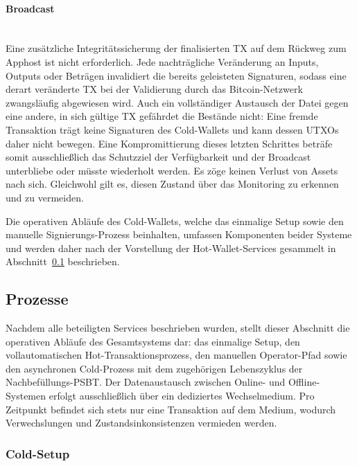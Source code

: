 \paragraph{Broadcast} \mbox{}\\
Eine zusätzliche Integritätssicherung der finalisierten \ac{TX} auf dem Rückweg zum Apphost ist nicht erforderlich. Jede nachträgliche Veränderung an Inputs, Outputs oder Beträgen invalidiert die bereits geleisteten Signaturen, sodass eine derart veränderte \ac{TX} bei der Validierung durch das Bitcoin-Netzwerk zwangsläufig abgewiesen wird. 
Auch ein vollständiger Austausch der Datei gegen eine andere, in sich gültige
\ac{TX} gefährdet die Bestände nicht: Eine fremde Transaktion trägt keine Signaturen des Cold-Wallets und kann dessen \acp{UTXO} daher nicht bewegen.
Eine Kompromittierung dieses letzten Schrittes beträfe somit ausschließlich das Schutzziel der Verfügbarkeit und der Broadcast unterbliebe oder müsste
wiederholt werden. Es zöge keinen Verlust von Assets nach sich. Gleichwohl gilt es, diesen Zustand über das Monitoring zu erkennen und zu vermeiden.

Die operativen Abläufe des Cold-Wallets, welche das einmalige Setup sowie den manuelle Signierungs-Prozess beinhalten, umfassen Komponenten beider Systeme und werden daher nach der Vorstellung der Hot-Wallet-Services gesammelt in Abschnitt~\ref{sec:prozesse} beschrieben.


\subsection{Prozesse} \label{sec:prozesse}

Nachdem alle beteiligten Services beschrieben wurden, stellt dieser Abschnitt die operativen Abläufe des Gesamtsystems dar: das einmalige Setup, den vollautomatischen Hot-Transaktionsprozess, den manuellen Operator-Pfad sowie den asynchronen Cold-Prozess mit dem zugehörigen Lebenszyklus der
Nachbefüllungs-\ac{PSBT}. 
Der Datenaustausch zwischen Online- und Offline-Systemen erfolgt ausschließlich über ein dediziertes Wechselmedium. Pro Zeitpunkt befindet sich stets nur eine Transaktion auf dem Medium, wodurch Verwechslungen und Zustandsinkonsistenzen vermieden werden.


\subsubsection{Cold-Setup} \label{sec:cold_setup}

